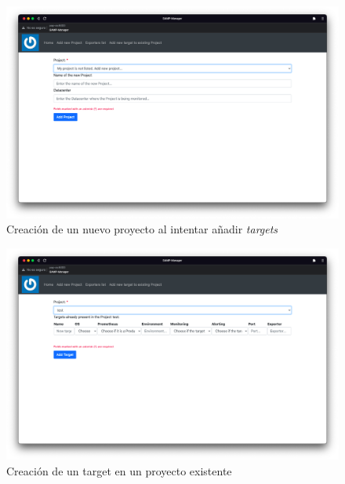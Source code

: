 \begin{figure}[H]
    \includegraphics[width=\textwidth]{include/desarrollo/app_images/add_target_project_not_listed.png}
    \caption{Creación de un nuevo proyecto al intentar añadir	\textit{targets}}
    \label{fig:gui_add_target_project_not_listed}
\end{figure}

\begin{figure}[H]
    \includegraphics[width=\textwidth]{include/desarrollo/app_images/add_target_test.png}
    \caption{Creación de un target en un proyecto existente}
    \label{fig:gui_add_target_test}
\end{figure}
